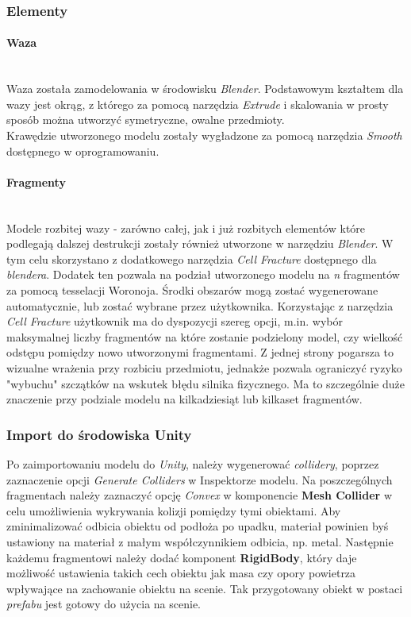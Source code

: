 \subsubsection{Elementy}
\paragraph{Waza}
\mbox{}\\
Waza została zamodelowania w środowisku \textit{Blender}. Podstawowym kształtem dla wazy jest okrąg, z którego za pomocą narzędzia \textit{Extrude} i skalowania w prosty sposób można utworzyć symetryczne, owalne przedmioty. \\
Krawędzie utworzonego modelu zostały wygładzone za pomocą narzędzia \textit{Smooth} dostępnego w oprogramowaniu. 
\paragraph{Fragmenty}
\mbox{}\\
Modele rozbitej wazy - zarówno całej, jak i już rozbitych elementów które podlegają dalszej destrukcji zostały również utworzone w narzędziu \textit{Blender}.
W tym celu skorzystano z dodatkowego narzędzia \textit{Cell Fracture} dostępnego dla \textit{blendera}. Dodatek ten pozwala na podział utworzonego modelu na  \textit{n} fragmentów za pomocą tesselacji Woronoja. Środki obszarów mogą zostać wygenerowane automatycznie, lub zostać wybrane przez użytkownika. Korzystając z narzędzia \textit{Cell Fracture} użytkownik ma do dyspozycji szereg opcji, m.in. wybór maksymalnej liczby fragmentów na które zostanie podzielony model, czy wielkość odstępu pomiędzy nowo utworzonymi fragmentami. Z jednej strony pogarsza to wizualne wrażenia przy rozbiciu przedmiotu, jednakże pozwala ograniczyć ryzyko "wybuchu" szczątków na wskutek błędu silnika fizycznego. Ma to szczególnie duże znaczenie przy podziale modelu na kilkadziesiąt lub kilkaset fragmentów.

\subsubsection{Import do środowiska Unity}
Po zaimportowaniu modelu do \textit{Unity}, należy wygenerować \textit{collidery}, poprzez zaznaczenie opcji \textit{Generate Colliders} w Inspektorze modelu. Na poszczególnych fragmentach należy zaznaczyć opcję \textit{Convex} w komponencie \textbf{Mesh Collider} w celu umożliwienia wykrywania kolizji pomiędzy tymi obiektami. Aby zminimalizować odbicia obiektu od podłoża po upadku, materiał powinien byś ustawiony na materiał z małym współczynnikiem odbicia, np. metal. Następnie każdemu fragmentowi należy dodać komponent \textbf{RigidBody}, który daje możliwość ustawienia takich cech obiektu jak masa czy opory powietrza wpływające na zachowanie obiektu na scenie. Tak przygotowany obiekt w postaci \textit{prefabu} jest gotowy do użycia na scenie.

